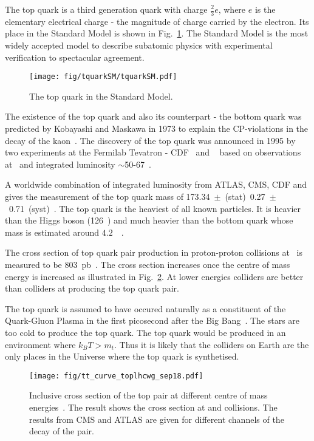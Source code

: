 The top quark is a third generation quark with charge $\frac{2}{3}e$, where $e$ is the elementary electrical charge - the magnitude of charge carried by the electron. Its place in the Standard Model is shown in Fig.~\ref{fig:top_quarkSM}. The Standard Model is the most widely accepted model to describe subatomic physics with experimental verification to spectacular agreement.

  \begin{figure}[hbtp]

    \centering
    \texttt{[image: fig/tquarkSM/tquarkSM.pdf]}
    \caption{The top quark in the Standard Model.}
    \label{fig:top_quarkSM}
    
  \end{figure}

The existence of the top quark and also its counterpart - the bottom quark was predicted by Kobayashi and Maskawa in 1973 to explain the CP-violations in the decay of the kaon~\cite{Kobayashi:1973fv}. The discovery of the top quark was announced in 1995 by two experiments at the Fermilab Tevatron - CDF~\cite{Abe:1995hr} and \DZERO~\cite{D0:1995jca} based on observations at ~\TeV and integrated luminosity $\sim$50-67~\fbinv.

A worldwide combination of integrated luminosity from ATLAS, CMS, CDF and \DZERO gives the measurement of the top quark mass of 173.34~$\pm$~(stat)~0.27~$\pm$~0.71~(syst)~\GeV. The top quark is the heaviest of all known particles. It is heavier than the Higgs boson (126~\GeV) and much heavier than the bottom quark whose mass is estimated around $4.2$~\GeV~\cite{Hoang:1999ye}.

The cross section of top quark pair production in proton-proton collisions at ~\TeV is measured to be 803~pb~\cite{Sirunyan:2018goh}. The cross section increases once the centre of mass energy is increased as illustrated in Fig.~\ref{fig:tt_curve_toplhcwg_sep18}. At lower energies \Pp\Pap colliders are better than \Pp\Pp colliders at producing the top quark pair.

The top quark is assumed to have occured naturally as a constituent of the Quark-Gluon Plasma in the first picosecond after the Big Bang~\cite{Husdal:2016haj}. The stars are too cold to produce the top quark. The top quark would be produced in an environment where $k_{B}T>m_{t}$. Thus it is likely that the colliders on Earth are the only places in the Universe where the top quark is synthetised.

\begin{figure}[hbtp]
  \centering
  \texttt{[image: fig/tt\_curve\_toplhcwg\_sep18.pdf]}
  \caption{Inclusive cross section of the top pair at different centre of mass energies~\cite{twiki:tt_curve_toplhcwg_sep18}. The result shows the cross section at \Pp\Pp and \Pp\Pap collisions. The results from CMS and ATLAS are given for different channels of the decay of the \ttbar pair.}
  \label{fig:tt_curve_toplhcwg_sep18}
\end{figure}

